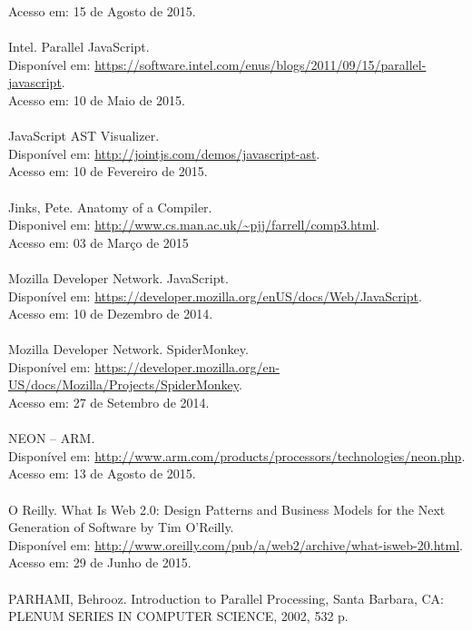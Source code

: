 \documentclass[12pt,a4paper]{article}
\begin{document}
Acesso em: 15 de Agosto de 2015. \\
\\
Intel. Parallel JavaScript. \\
Disponível em: \url{https://software.intel.com/enus/blogs/2011/09/15/parallel-javascript}. \\
Acesso em: 10 de Maio de 2015. \\
\\
JavaScript AST Visualizer. \\
Disponível em: \url{http://jointjs.com/demos/javascript-ast}. \\
Acesso em: 10 de Fevereiro de 2015. \\
\\
Jinks, Pete. Anatomy of a Compiler. \\
Disponivel em: \url{http://www.cs.man.ac.uk/~pjj/farrell/comp3.html}. \\
Acesso em: 03 de Março de 2015 \\
\\
Mozilla Developer Network. JavaScript. \\
Disponível em: \url{https://developer.mozilla.org/enUS/docs/Web/JavaScript}. \\
Acesso em: 10 de Dezembro de 2014. \\
\\
Mozilla Developer Network. SpiderMonkey. \\
Disponível em: \url{https://developer.mozilla.org/en-US/docs/Mozilla/Projects/SpiderMonkey}. \\
Acesso em: 27 de Setembro de 2014. \\
\\
NEON – ARM. \\
Disponível em: \url{http://www.arm.com/products/processors/technologies/neon.php}. \\
Acesso em: 13 de Agosto de 2015. \\
\\
O Reilly. What Is Web 2.0: Design Patterns and Business Models for the Next Generation of Software by Tim O'Reilly. \\
Disponível em: \url{http://www.oreilly.com/pub/a/web2/archive/what-isweb-20.html}. \\
Acesso em: 29 de Junho de 2015. \\
\\
PARHAMI, Behrooz. Introduction to Parallel Processing, Santa Barbara, CA: PLENUM SERIES IN COMPUTER SCIENCE, 2002, 532 p. \\
\\
\end{document}
